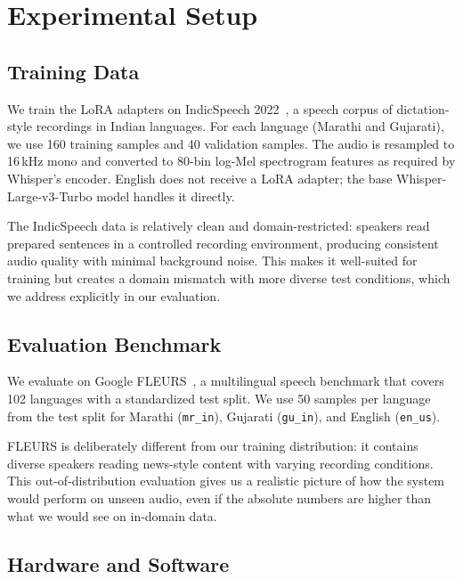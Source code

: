 
\section{Experimental Setup}
\label{sec:setup}

\subsection{Training Data}

We train the LoRA adapters on IndicSpeech 2022~\cite{indicspeech2022}, a speech corpus of dictation-style recordings in Indian languages. For each language (Marathi and Gujarati), we use 160 training samples and 40 validation samples. The audio is resampled to 16\,kHz mono and converted to 80-bin log-Mel spectrogram features as required by Whisper's encoder. English does not receive a LoRA adapter; the base Whisper-Large-v3-Turbo model handles it directly.

The IndicSpeech data is relatively clean and domain-restricted: speakers read prepared sentences in a controlled recording environment, producing consistent audio quality with minimal background noise. This makes it well-suited for training but creates a domain mismatch with more diverse test conditions, which we address explicitly in our evaluation.

\subsection{Evaluation Benchmark}

We evaluate on Google FLEURS~\cite{conneau2023fleurs}, a multilingual speech benchmark that covers 102 languages with a standardized test split. We use 50 samples per language from the test split for Marathi (\texttt{mr\_in}), Gujarati (\texttt{gu\_in}), and English (\texttt{en\_us}). 

FLEURS is deliberately different from our training distribution: it contains diverse speakers reading news-style content with varying recording conditions. This out-of-distribution evaluation gives us a realistic picture of how the system would perform on unseen audio, even if the absolute numbers are higher than what we would see on in-domain data.

\subsection{Hardware and Software}

